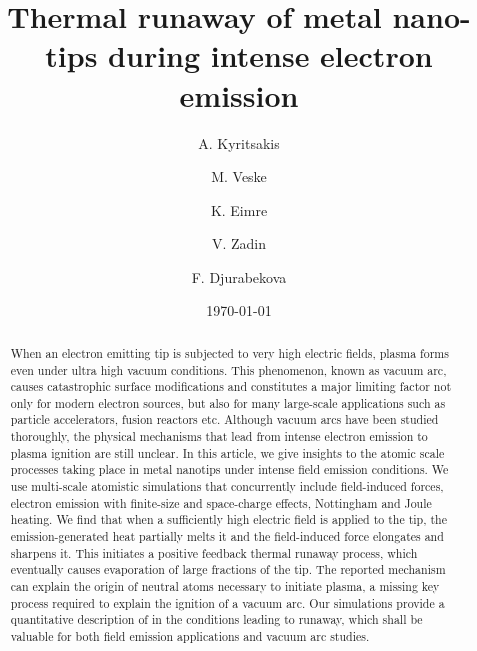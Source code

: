 \documentclass[%
 aps,
 prb,%
 amsmath,amssymb,
reprint,%
superscriptaddress,
]{revtex4-1}
\begin{document}

\title[Sample title]{Thermal runaway of metal nano-tips during intense electron emission}

\author{A. Kyritsakis}

\author{M. Veske}%

\author{K. Eimre}

\author{V. Zadin}

\author{F. Djurabekova}

\date{\today}

\begin{abstract}

When an electron emitting tip is subjected to very high electric fields, plasma forms even under ultra high vacuum conditions.
This phenomenon, known as vacuum arc, causes catastrophic surface modifications and constitutes a major limiting factor not only for modern electron sources, but also for many large-scale applications such as particle accelerators, fusion reactors etc. 
Although vacuum arcs have been studied thoroughly, the physical mechanisms that lead from intense electron emission to plasma ignition are still unclear.
In this article, we give insights to the atomic scale processes taking place in metal nanotips under intense field emission conditions. We use multi-scale atomistic simulations that concurrently include field-induced forces, electron emission with finite-size and space-charge effects, Nottingham and Joule heating. 
We find that when a sufficiently high electric field is applied to the tip, the emission-generated heat partially melts it and the field-induced force elongates and sharpens it.
This initiates a positive feedback thermal runaway process, which eventually causes evaporation of large fractions of the tip.
The reported mechanism can explain the origin of neutral atoms necessary to initiate plasma, a missing key process required to explain the ignition of a vacuum arc.
Our simulations provide a quantitative description of in the conditions leading to runaway, which shall be valuable for both field emission applications and vacuum arc studies.


\end{abstract}
\end{document}
